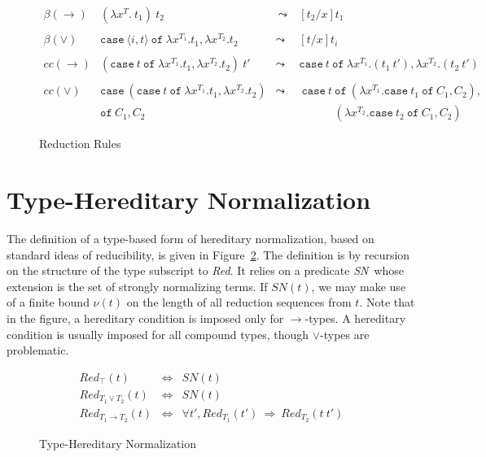 \documentclass{article}
\newcommand{\red}[0]{\textit{Red}}
\newcommand{\sn}[0]{\textit{SN}}
\newcommand{\To}{\Rightarrow}
\begin{document}
\begin{figure}[p]
\[
\begin{array}{llll}
\beta(\to)\  & (\lambda x^T.\ t_1)\ t_2 & \ \leadsto\  & [t_2/x]t_1 \\ \\
\beta(\vee)\ & \texttt{case}\ \langle i, t \rangle\ \texttt{of}\ \lambda x^{T_1}. t_1, \lambda x^{T_2}. t_2 & \leadsto & 
  [t/x]t_i \\ \\
\textit{cc}(\to) &(\texttt{case}\ t\ \texttt{of}\ \lambda x^{T_1}.t_1,\lambda x^{T_2}.t_2)\ t' & \leadsto & 
  \texttt{case}\ t\ \texttt{of}\ \lambda x^{T_1}.(t_1\ t'), \lambda x^{T_2}.(t_2\ t') \\ \\
\textit{cc}(\vee) & \texttt{case}\ (\texttt{case}\ t\ \texttt{of}\ \lambda x^{T_1}.t_1,\lambda x^{T_2}.t_2) & \leadsto &\ 
\texttt{case}\ t\ \texttt{of}\ (\lambda x^{T_1}.\texttt{case}\ t_1\ \texttt{of}\ C_1, C_2),\\
\ & \texttt{of}\ C_1, C_2 \ & \ &
\ \ \ \ \ \ \ \ \ \ \ \ \ \ (\lambda x^{T_2}.\texttt{case}\ t_2\ \texttt{of}\ C_1, C_2)
\end{array}
\]
\caption{\label{fig:red}Reduction Rules}
\end{figure}

\section{Type-Hereditary Normalization}

The definition of a type-based form of hereditary normalization, based
on standard ideas of reducibility, is given in
Figure~\ref{fig:type-hn}.  The definition is by recursion on the
structure of the type subscript to \red.  It relies on a predicate
\sn\ whose extension is the set of strongly normalizing terms.  If
$\sn(t)$, we may make use of a finite bound $\nu(t)$ on the length of
all reduction sequences from $t$.  Note that in the figure, a
hereditary condition is imposed only for $\to$-types.  A hereditary
condition is usually imposed for all compound types, though
$\vee$-types are problematic.

\begin{figure}[p]
\begin{eqnarray*}
\red_{\top}(t) & \Leftrightarrow & \sn(t) \\
\red_{T_1\vee T_2}(t) & \Leftrightarrow & \sn(t) \\
\red_{T_1\to T_2}(t) & \Leftrightarrow & \forall t', \red_{T_1}(t')\ \To\ \red_{T_2}(t\ t')
\end{eqnarray*}
\caption{\label{fig:type-hn} Type-Hereditary Normalization}
\end{figure}
\end{document}

